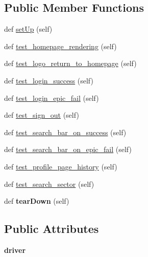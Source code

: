 \subsection*{Public Member Functions}
\begin{DoxyCompactItemize}
\item 
def \mbox{\hyperlink{classprodigal__app_1_1tests_1_1_test_signup_ac04e2dd8b5868c685df446ef1231ade5}{set\+Up}} (self)
\item 
def \mbox{\hyperlink{classprodigal__app_1_1tests_1_1_test_signup_abb5fc69e1b629420635b93f8c3dba6b1}{test\+\_\+homepage\+\_\+rendering}} (self)
\item 
def \mbox{\hyperlink{classprodigal__app_1_1tests_1_1_test_signup_ae244ced3b8e70000f6afdeaed2979ffa}{test\+\_\+logo\+\_\+return\+\_\+to\+\_\+homepage}} (self)
\item 
def \mbox{\hyperlink{classprodigal__app_1_1tests_1_1_test_signup_aede34571b77bc47f2949da041265394d}{test\+\_\+login\+\_\+success}} (self)
\item 
def \mbox{\hyperlink{classprodigal__app_1_1tests_1_1_test_signup_a8538a1a766b76158b177db2283517fa5}{test\+\_\+login\+\_\+epic\+\_\+fail}} (self)
\item 
def \mbox{\hyperlink{classprodigal__app_1_1tests_1_1_test_signup_a43f843ccdd825452fc81d306b01abe5d}{test\+\_\+sign\+\_\+out}} (self)
\item 
def \mbox{\hyperlink{classprodigal__app_1_1tests_1_1_test_signup_ab49ffe3f31703792f93f99522aab52f5}{test\+\_\+search\+\_\+bar\+\_\+on\+\_\+success}} (self)
\item 
def \mbox{\hyperlink{classprodigal__app_1_1tests_1_1_test_signup_a625db3369fe1cf025f7aa481d7a2fc87}{test\+\_\+search\+\_\+bar\+\_\+on\+\_\+epic\+\_\+fail}} (self)
\item 
def \mbox{\hyperlink{classprodigal__app_1_1tests_1_1_test_signup_aac1c7c01677915d7704480dcbfc88219}{test\+\_\+profile\+\_\+page\+\_\+history}} (self)
\item 
def \mbox{\hyperlink{classprodigal__app_1_1tests_1_1_test_signup_a1e34a8f57c33fb8c81d5a8487fe6df91}{test\+\_\+search\+\_\+sector}} (self)
\item 
\mbox{\label{classprodigal__app_1_1tests_1_1_test_signup_a72262614f1ac88a0d490363ba74e9c66}} 
def {\bfseries tear\+Down} (self)
\end{DoxyCompactItemize}
\subsection*{Public Attributes}
\begin{DoxyCompactItemize}
\item 
\mbox{\label{classprodigal__app_1_1tests_1_1_test_signup_a9e896059a48012017fab253d159a3d4a}} 
{\bfseries driver}
\end{DoxyCompactItemize}


